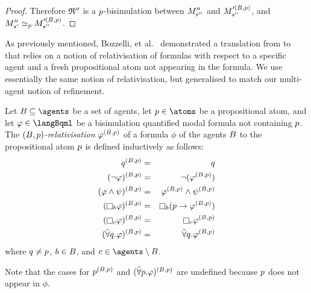\begin{proof}
Therefore $\bisimulation''$ is a $\atomP$-bisimulation between $\kPModelPP{\kStateSPP}$ and $\kPModel[\prime(\agentsB, \atomP)]{\kStateSPP}$, and $\kPModelPP{\kStateSP} \bisimilar[\atomP] \kPModel[\prime(\agentsB, \atomP)]{\kStateSPP}$.
\end{proof}

As previously mentioned, Bozzelli, et al.~\cite{bozzelli:2014b} demonstrated a translation from \langRml{} to \langBqml{} that relies on a notion of relativisation of \langBqml{} formulas with respect to a specific agent and a fresh propositional atom not appearing in the formula.
We use essentially the same notion of relativisation, but generalised to match our multi-agent notion of refinement.

\begin{definition}[Relativisation]
Let $\agentsB \subseteq \agents$ be a set of agents, let $\atomP \in \atoms$ be a propositional atom, and let $\phi \in \langBqml$ be a bisimulation quantified modal formula not containing $\atomP$.
The {\em $(\agentsB, \atomP)$-relativisation} $\phi^{(\agentsB, \atomP)}$ of a formula $\phi$ of the agents $\agentsB$ to the propositional atom $\atomP$ is defined inductively as follows:
\begin{eqnarray*}
    \atomQ^{(\agentsB, \atomP)} &=& \atomQ\\
    (\lnot \phi)^{(\agentsB, \atomP)} &=& \lnot (\phi^{(\agentsB, \atomP)})\\
    (\phi \land \psi)^{(\agentsB, \atomP)} &=& \phi^{(\agentsB, \atomP)} \land \psi^{(\agentsB, \atomP)}\\
    (\necessaryB \phi)^{(\agentsB, \atomP)} &=& \necessaryB (\atomP \implies \phi^{(\agentsB, \atomP)})\\
    (\necessaryC \phi)^{(\agentsB, \atomP)} &=& \necessaryC \phi^{(\agentsB, \atomP)}\\
    (\allbisimsQ \phi)^{(\agentsB, \atomP)} &=& \allbisimsQ \phi^{(\agentsB, \atomP)}\\
\end{eqnarray*}
where $\atomQ \neq \atomP$, $\agentB \in \agentsB$, and $\agentC \in \agents \setminus \agentsB$.

Note that the cases for $\atomP^{(\agentsB, \atomP)}$ and $(\allbisimsP \phi)^{(\agentsB, \atomP)}$ are undefined because $\atomP$ does not appear in $\phi$.
\end{definition}

